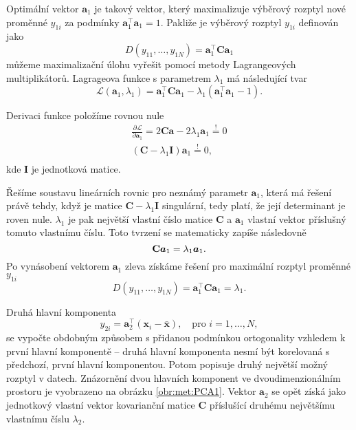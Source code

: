 Optimální vektor $\bm{a}_1$ je takový vektor, který maximalizuje výběrový rozptyl nové proměnné $y_{1i}$ za podmínky $\bm{a}_1^\top\bm{a}_1 = 1$. Pakliže je výběrový rozptyl $y_{1i}$ definován jako 
\begin{equation}
    D(y_{11}, \ldots, y_{1N}) = \bm{a}_1^\top \mathbf{C} \bm{a}_1
\end{equation}
můžeme maximalizační úlohu vyřešit pomocí metody Lagrangeových multiplikátorů. Lagrageova funkce s parametrem $\lambda_1$ má následující tvar
\begin{equation}
    \mathcal{L}(\bm{a}_1, \lambda_1) = \bm{a}_1^\top \mathbf{C} \bm{a}_1 - \lambda_1(\bm{a}_1^\top\bm{a}_1 - 1).
\end{equation}

Derivaci funkce položíme rovnou nule 
\begin{align*}
    \frac{\partial \mathcal{L}}{\partial \bm{a}_1}  = 2 \mathbf{C} \bm{a} - 2\lambda_1 \bm{a}_1 \overset{!}{=}  0 \\
    (\mathbf{C} - \lambda_1 \mathbf{I} ) \bm{a}_1 \overset{!}{=}  0,  \\
\end{align*}
kde $\mathbf{I}$ je jednotková matice.

Řešíme soustavu lineárních rovnic pro neznámý parametr $\bm{a}_1$, která má řešení právě tehdy, když je matice $\mathbf{C} - \lambda_1 \mathbf{I} $ singulární, tedy platí, že její determinant  je roven nule. $\lambda_1$ je pak největší vlastní číslo matice $\mathbf{C}$ a $\bm{a}_1$ vlastní vektor příslušný tomuto vlastnímu číslu. Toto tvrzení se matematicky zapíše následovně
\begin{equation}
    \mathbf{C} \bm{a}_1 = \lambda_1 \bm{a}_1. \\
\end{equation}
Po vynásobení vektorem $\bm{a}_1$ zleva získáme řešení pro maximální rozptyl proměnné $y_{1i}$
\begin{equation}
    D(y_{11}, \ldots, y_{1N}) = \bm{a}_1^\top \mathbf{C} \bm{a}_1 = \lambda_1.
\end{equation}


Druhá hlavní komponenta
\begin{equation}
    y_{2i} = \bm{a}_2^\top (\bm{x}_i - \bar{\bm{x}}), \quad \mbox{pro } i=1,\ldots,N,
\end{equation}
se vypočte obdobným způsobem s přidanou podmínkou ortogonality vzhledem k první hlavní komponentě -- druhá hlavní komponenta nesmí být korelovaná s předchozí, první hlavní komponentou. Potom popisuje druhý největší možný rozptyl v datech. Znázornění dvou hlavních komponent ve dvoudimenzionálním prostoru je vyobrazeno na obrázku \ref*{obr:met:PCA1}.
Vektor  $\bm{a}_2$ se opět získá jako jednotkový vlastní vektor kovarianční matice $\mathbf{C}$ příslušící druhému největšímu vlastnímu číslu $\lambda_2$.\cite{bib:PCA1} %

